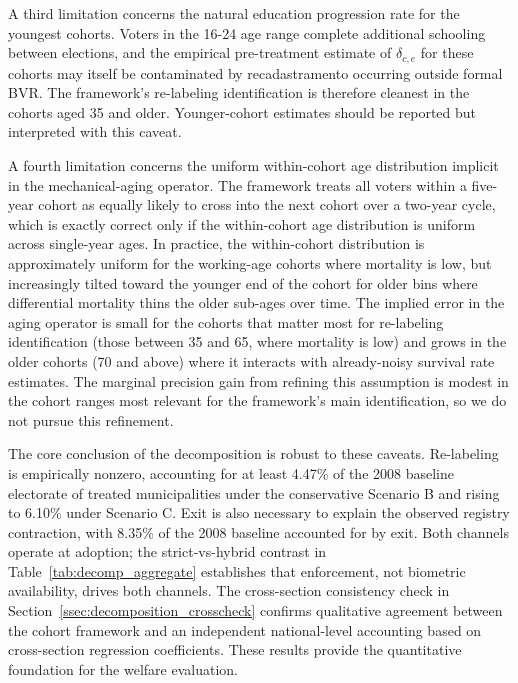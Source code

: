 A third limitation concerns the natural education progression rate for the youngest cohorts. Voters in the 16-24 age range complete additional schooling between elections, and the empirical pre-treatment estimate of $\delta_{c,e}$ for these cohorts may itself be contaminated by recadastramento occurring outside formal BVR. The framework's re-labeling identification is therefore cleanest in the cohorts aged 35 and older. Younger-cohort estimates should be reported but interpreted with this caveat.

A fourth limitation concerns the uniform within-cohort age distribution implicit in the mechanical-aging operator. The framework treats all voters within a five-year cohort as equally likely to cross into the next cohort over a two-year cycle, which is exactly correct only if the within-cohort age distribution is uniform across single-year ages. In practice, the within-cohort distribution is approximately uniform for the working-age cohorts where mortality is low, but increasingly tilted toward the younger end of the cohort for older bins where differential mortality thins the older sub-ages over time. The implied error in the aging operator is small for the cohorts that matter most for re-labeling identification (those between 35 and 65, where mortality is low) and grows in the older cohorts (70 and above) where it interacts with already-noisy survival rate estimates. The marginal precision gain from refining this assumption is modest in the cohort ranges most relevant for the framework's main identification, so we do not pursue this refinement.

The core conclusion of the decomposition is robust to these caveats. Re-labeling is empirically nonzero, accounting for at least 4.47\% of the 2008 baseline electorate of treated municipalities under the conservative Scenario B and rising to 6.10\% under Scenario C. Exit is also necessary to explain the observed registry contraction, with 8.35\% of the 2008 baseline accounted for by exit. Both channels operate at adoption; the strict-vs-hybrid contrast in Table~\ref{tab:decomp_aggregate} establishes that enforcement, not biometric availability, drives both channels. The cross-section consistency check in Section~\ref{ssec:decomposition_crosscheck} confirms qualitative agreement between the cohort framework and an independent national-level accounting based on cross-section regression coefficients. These results provide the quantitative foundation for the welfare evaluation.
